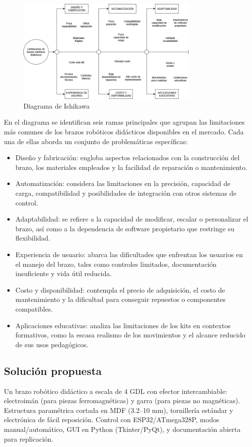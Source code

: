 \begin{figure}[h]
  \centering
  \includegraphics[width=0.8\textwidth]{anexos/Diagrama Ishikawa.png}
  \caption{Diagrama de Ishikawa}\label{fig:Diagrama Ishikawa}
\end{figure}
En el diagrama se identifican seis ramas principales que agrupan las limitaciones más comunes de los brazos robóticos didácticos disponibles en el mercado. Cada una de ellas aborda un conjunto de problemáticas específicas:
\begin{itemize}
  \item Diseño y fabricación: engloba aspectos relacionados con la construcción del brazo, los materiales empleados y la facilidad de reparación o mantenimiento.
  \item Automatización: considera las limitaciones en la precisión, capacidad de carga, compatibilidad y posibilidades de integración con otros sistemas de control.
  \item Adaptabilidad: se refiere a la capacidad de modificar, escalar o personalizar el brazo, así como a la dependencia de software propietario que restringe su flexibilidad.
  \item Experiencia de usuario: abarca las dificultades que enfrentan los usuarios en el manejo del brazo, tales como controles limitados, documentación insuficiente y vida útil reducida.
  \item Costo y disponibilidad: contempla el precio de adquisición, el costo de mantenimiento y la dificultad para conseguir repuestos o componentes compatibles.
  \item Aplicaciones educativas: analiza las limitaciones de los kits en contextos formativos, como la escasa realismo de los movimientos y el alcance reducido de sus usos pedagógicos.
\end{itemize}

\subsection{Solución propuesta}
Un brazo robótico didáctico a escala de 4 GDL con efector intercambiable: electroimán (para piezas ferromagnéticas) y garra (para piezas no magnéticas). Estructura paramétrica cortada en MDF (3.2–10 mm), tornillería estándar y electrónica de fácil reposición. Control con ESP32/ATmega328P, modos manual/automático, GUI en Python (Tkinter/PyQt), y documentación abierta para replicación.

